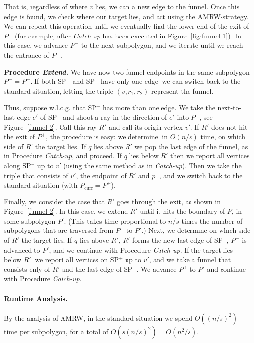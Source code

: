 \documentclass[11pt,a4paper]{article}
\begin{document}
That is, regardless of where $v$ lies, we can a new edge to the funnel. Once this edge is found, we check where our target lies, and act using the AMRW-strategy. We can repeat this operation until we eventually find the lower end of the exit of $P^{-}$ (for example, after  {\em Catch-up} has been executed in Figure~\ref{fig:funnel-1}). In this case, we advance $P^-$ to the next subpolygon, and we iterate until we reach the entrance of $P^+$.

\noindent
\textbf{Procedure \emph{Extend}.}
We have now two funnel endpoints in the same subpolygon $P^+=P^-$.
If both SP$^+$ and SP$^-$ have only one edge, we can switch back to
the standard situation, letting the triple $(v, r_1, r_2)$ represent the funnel.

Thus, suppose w.l.o.g. that SP$^-$ has more than one edge. We take
the next-to-last edge $e'$ of SP$^-$ and shoot a ray in the direction of
$e'$ into $P^-$, see Figure~\ref{funnel-2}. Call this ray $R'$ and call its origin
vertex $v'$.
If $R'$ does not hit the exit of $P^+$,
the procedure is easy:
we determine, in $O(n/s)$ time, on which side of $R'$ the target lies.
If $q$ lies above $R'$ we pop the last edge of the funnel, as in
Procedure \emph{Catch-up}, and proceed.
If $q$ lies below $R'$ then
we report all vertices along SP$^-$ up to $v'$ (using the same method as
in \emph{Catch-up}).
Then we take the triple that consists of $v'$, the endpoint of $R'$ and
$p^-$, and we switch back to the standard situation (with $P_\text{curr} = P^+$).

Finally, we consider the case that $R'$ goes through the exit,
as shown in Figure~\ref{funnel-2}.
In this case, we extend $R'$ until it hits the boundary of $P$,
in some subpolygon $P'$.
(This takes time
proportional to $n/s$ times the number of subpolygons that are
traversed from $P^+$ to $P'$.)
Next, we determine on which side of $R'$ the target lies.
If $q$ lies above $R'$, $R'$ forms the new last edge of SP$^-$,
$P^-$ is advanced to
$P'$, and we continue with Procedure \emph{Catch-up}.
If the target lies below $R'$, we report all vertices on SP$^+$
up to $v'$, and we take a funnel that consists
only of $R'$ and the last edge of SP$^-$.
We advance $P^+$ to
$P'$ and continue with Procedure \emph{Catch-up}.


\paragraph{Runtime Analysis.}

By the analysis of AMRW, in the standard situation we spend
$O((n/s)^2)$ time per subpolygon,
for a total of $O(s(n/s)^2)=O(n^2/s)$.
\end{document}
